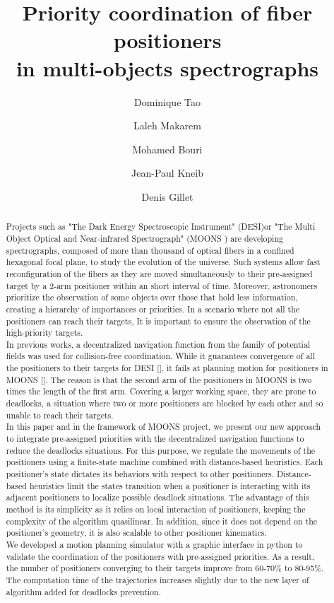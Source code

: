 \documentclass[]{spie}  %
\title{Priority coordination of fiber positioners\\
	in multi-objects spectrographs }
\author[a]{Dominique Tao}
\author[b]{Laleh Makarem}
\author[c]{Mohamed Bouri}
\author[d]{Jean-Paul Kneib}
\author[e]{Denis Gillet}
\affil[a,b,e]{REACT, Ecole Polytechnique Federale de Lausanne (EPFL), Switzerland}
\affil[c]{LSRO, Ecole Polytechnique Federale de Lausanne (EPFL), Switzerland}
\affil[d]{LASTRO, Ecole Polytechnique Federale de Lausanne (EPFL), Switzerland}
\begin{document}
 
	\maketitle
	
	\begin{abstract}
		Projects such as "The Dark Energy Spectroscopic Instrument" (DESI)or  "The Multi Object Optical and Near-infrared Spectrograph" (MOONS ) are developing spectrographs, composed of more than thousand of optical fibers in a confined hexagonal focal plane, to study the evolution of the universe. Such systems allow fast reconfiguration of the fibers as they are moved simultaneously to their pre-assigned target by a 2-arm positioner within an short interval of time. Moreover, astronomers prioritize the observation of some objects over those that hold less information, creating a hierarchy of importances or priorities. In a scenario where not all the positioners can reach their targets, It is important to ensure the observation of the high-priority targets. \\
		In previous works, a decentralized navigation function from the family of potential fields was used for collision-free coordination. While it guarantees convergence of all the positioners to their targets for DESI [], it fails at planning motion for positioners in MOONS []. The reason is that the second arm of the positioners in MOONS is two times the length of the first arm. Covering a larger working space, they are prone to deadlocks, a situation where two or more positioners are blocked by each other and so unable to reach their targets.\\
		In this paper and in the framework of MOONS project, we present our new approach to integrate pre-assigned priorities with the decentralized navigation functions to reduce the deadlocks situations. For this purpose, we regulate the movements of the positioners using a finite-state machine combined with distance-based heuristics. Each positioner's state dictates its behaviors with respect to other positioners. Distance-based heuristics limit the states transition when a positioner is interacting with its adjacent positioners to localize possible deadlock situations. The advantage of this method is its simplicity as it relies on local interaction of positioners, keeping the complexity of the algorithm quasilinear. In addition, since it does not depend on the positioner's geometry, it is also scalable to other positioner kinematics. \\
		We developed a motion planning simulator with a graphic interface in python to validate the coordination of the positioners with pre-assigned priorities.  As a result, the number of positioners converging to their targets improve from 60-70\% to 80-95\%. The computation time of the trajectories increases slightly due to the new layer of algorithm added for deadlocks prevention.
	\end{abstract}
	
\end{document}
